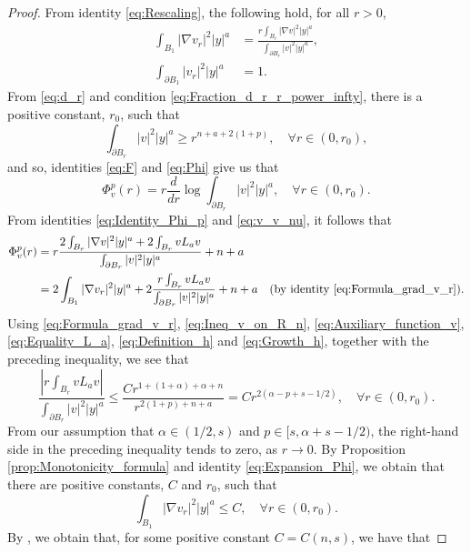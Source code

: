 \documentclass[11pt,reqno]{amsart}
\theoremstyle{definition}
\theoremstyle{remark}
\begin{document}
\begin{proof}
From identity \eqref{eq:Rescaling}, the following hold, for all $r>0$,
\begin{align}
\label{eq:Formula_grad_v_r}
\int_{B_1}|\nabla v_r|^2 |y|^a &=\frac{r\int_{B_r} |\nabla v|^2|y|^a}{\int_{\partial B_r} |v|^2|y|^a},\\
\label{eq:v_r_partial_B_1}
\int_{\partial B_1} |v_r|^2 |y|^a&=1.
\end{align}
From \eqref{eq:d_r} and condition \eqref{eq:Fraction_d_r_r_power_infty}, there is a positive constant, $r_0$, such that
\begin{equation}
\label{eq:Inequality_d_r}
\int_{\partial B_r}|v|^2|y|^a \geq r^{n+a+2(1+p)},\quad\forall r\in (0,r_0),
\end{equation}
and so, identities \eqref{eq:F} and \eqref{eq:Phi} give us that
$$
\Phi^p_v(r) = r\frac{d}{dr} \log \int_{\partial B_r}|v|^2|y|^a, \quad\forall r\in (0,r_0).
$$
From identities \eqref{eq:Identity_Phi_p} and \eqref{eq:v_v_nu}, it follows that
\begin{align}
\Phi^p_v(r) &= r\frac{2\int_{B_r}|\nabla v|^2|y|^a + 2\int_{B_r} v L_a v}{\int_{\partial B_r}|v|^2|y|^a}+n+a\notag\\
\label{eq:Expansion_Phi}
&= 2\int_{B_1}|\nabla v_r|^2 |y|^a + 2 \frac{r\int_{B_r} v L_a v}{\int_{\partial B_r} |v|^2|y|^a}+n+a\quad\hbox{(by identity \eqref{eq:Formula_grad_v_r}).}
\end{align}
Using \eqref{eq:Formula_grad_v_r}, \eqref{eq:Ineq_v_on_R_n}, \eqref{eq:Auxiliary_function_v}, \eqref{eq:Equality_L_a}, \eqref{eq:Definition_h} and \eqref{eq:Growth_h}, together with the preceding inequality, we see that
\begin{equation}
\label{eq:Inequality_second_term_Phi}
\frac{\left|r\int_{B_r} v L_a v\right|}{\int_{\partial B_r} |v|^2|y|^a} \leq \frac{Cr^{1+(1+\alpha)+\alpha+n}}{r^{2(1+p)+n+a}} = Cr^{2(\alpha-p+s-1/2)},\quad\forall r\in (0,r_0).
\end{equation}
From our assumption that $\alpha\in (1/2,s)$ and $p \in [s,\alpha+s-1/2)$, the right-hand side in the preceding inequality tends to zero, as $r\rightarrow 0$. By Proposition \ref{prop:Monotonicity_formula} and identity \eqref{eq:Expansion_Phi}, we obtain that there are positive constants, $C$ and $r_0$, such that
\begin{equation}
\label{eq:Uniform_bound_grad_v_r}
\int_{B_1}|\nabla v_r|^2 |y|^a  \leq C,\quad\forall r\in (0,r_0).
\end{equation}
By \cite[Lemma 2.12]{Caffarelli_Salsa_Silvestre_2008}, we obtain that, for some positive constant $C=C(n,s)$, we have that

\end{proof}
\end{document}
